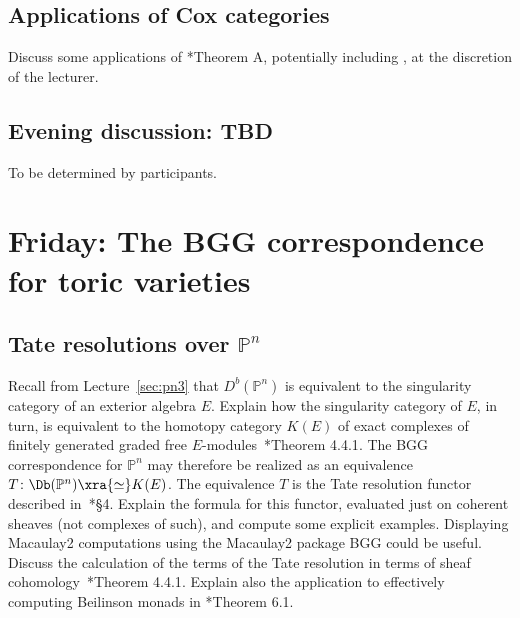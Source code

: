 \documentclass[11pt]{amsart}
\numberwithin{equation}{section}
\theoremstyle{definition}
\theoremstyle{remark}
\newcommand{\PP}{\mathbb P}
\def\co{\colon}
\begin{document}
\subsection{Applications of Cox categories}
Discuss some applications of \cite{king}*{Theorem A}, potentially including \cite[Proposition 1.3, Theorems 1.4, 1.5]{king}, at the discretion of the lecturer.


\subsection*{Evening discussion: TBD}  To be determined by participants.

\section{Friday: The BGG correspondence for toric varieties}

\subsection{Tate resolutions over $\PP^n$}
Recall from Lecture~\ref{sec:pn3} that $D^b(\PP^n)$ is equivalent to the singularity category of an exterior algebra $E$. Explain how the singularity category of $E$, in turn, is equivalent to the homotopy category $K(E)$ of exact complexes of finitely generated graded free $E$-modules~\cite{buchweitz}*{Theorem 4.4.1}. The BGG correspondence for $\PP^n$ may therefore be realized as an equivalence $T \co \Db(\PP^n) \xra{\simeq} K(E)$. The equivalence $T$ is the Tate resolution functor described in~\cite{EFS}*{\S 4}. Explain the formula for this functor, evaluated just on coherent sheaves (not complexes of such), and compute some explicit examples. Displaying Macaulay2 computations using the Macaulay2 package BGG could be useful. Discuss the calculation of the terms of the Tate resolution in terms of sheaf cohomology~\cite{EFS}*{Theorem 4.4.1}. Explain also the application to effectively computing Beilinson monads in \cite{EFS}*{Theorem 6.1}. 
\end{document}

